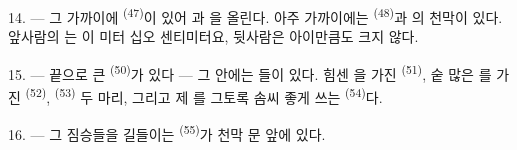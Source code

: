 14. --- 그 가까이에  \textsuperscript{(47)}이 있어 과
을 올린다. 아주 가까이에는  \textsuperscript{(48)}과
의 천막이 있다. 앞사람의 는 이 미터 십오 센티미터요,
뒷사람은 아이만큼도 크지 않다.

15. --- 끝으로 큰  \textsuperscript{(50)}가 있다 — 그 안에는
들이 있다. 힘센 을 가진 
\textsuperscript{(51)}, 숱 많은 를 가진 
\textsuperscript{(52)},  \textsuperscript{(53)} 두 마리, 그리고 제
를 그토록 솜씨 좋게 쓰는  \textsuperscript{(54)}다.

16. --- 그 짐승들을 길들이는  \textsuperscript{(55)}가 천막 문 앞에 있다.

\VUsaut{6.0mm}
\VUfilet{22mm}
